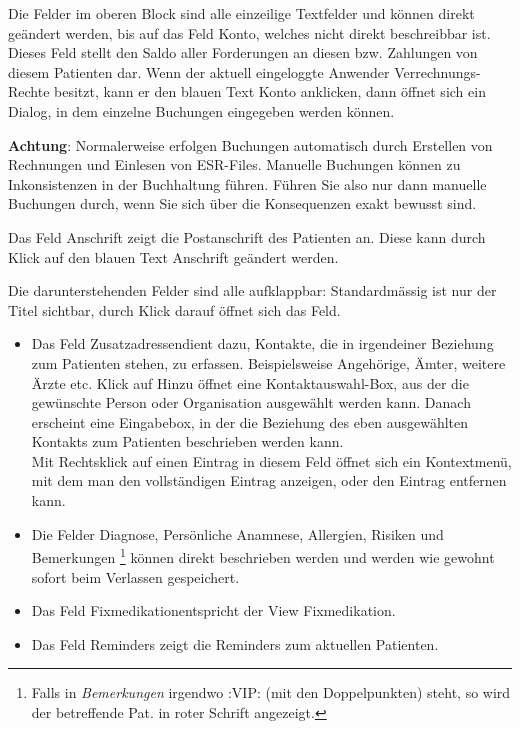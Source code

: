 Die Felder im oberen Block sind alle einzeilige Textfelder und können direkt geändert
werden, bis auf das Feld \glqq Konto\grqq{}, welches nicht direkt beschreibbar
ist. Dieses Feld stellt den Saldo aller Forderungen an diesen bzw. Zahlungen von
diesem Patienten dar. Wenn der aktuell eingeloggte Anwender Verrechnungs-Rechte
besitzt, kann er den blauen Text \glqq Konto\grqq{} anklicken, dann öffnet sich
ein Dialog, in dem einzelne Buchungen eingegeben werden können.

\textbf{Achtung}: Normalerweise erfolgen Buchungen automatisch durch Erstellen
von Rechnungen und Einlesen von ESR-Files. Manuelle Buchungen können zu
Inkonsistenzen in der Buchhaltung führen. Führen Sie also nur dann manuelle
Buchungen durch, wenn Sie sich über die Konsequenzen exakt bewusst sind.

Das Feld \glqq Anschrift\grqq{} zeigt die Postanschrift des Patienten an. Diese
kann durch Klick auf den blauen Text \glqq Anschrift \grqq{}geändert werden.

Die darunterstehenden Felder sind alle aufklappbar: Standardmässig ist nur der
Titel sichtbar, durch Klick darauf öffnet sich das Feld.
\begin{itemize}
  \item Das Feld \glqq Zusatzadressen\grqq{}dient dazu, Kontakte, die in
  irgendeiner Beziehung zum Patienten stehen, zu erfassen. Beispielsweise
  Angehörige, Ämter, weitere Ärzte etc. Klick auf \glqq Hinzu\grqq{} öffnet eine
  Kontaktauswahl-Box, aus der die gewünschte Person oder Organisation ausgewählt
  werden kann. Danach erscheint eine Eingabebox, in der die Beziehung des eben
  ausgewählten Kontakts zum Patienten beschrieben werden kann. \\
  Mit Rechtsklick auf einen Eintrag in diesem Feld öffnet sich ein Kontextmenü,
  mit dem man den vollständigen Eintrag anzeigen, oder den Eintrag entfernen kann.
  \item Die Felder \glqq Diagnose\grqq, \glqq Persönliche Anamnese\grqq{},
  \glqq Allergien\grqq{}, \glqq Risiken\grqq{} und \glqq Bemerkungen \footnote{Falls in \textit{Bemerkungen} irgendwo :VIP: (mit den Doppelpunkten) steht, so wird der betreffende Pat. in roter Schrift angezeigt.}\grqq{}
  können direkt beschrieben werden und werden wie gewohnt sofort beim Verlassen
  gespeichert.
  \item Das Feld \glqq Fixmedikation\grqq{}entspricht der View Fixmedikation.
  \item Das Feld \glqq Reminders\grqq{} zeigt die Reminders zum aktuellen Patienten.
\end{itemize}
